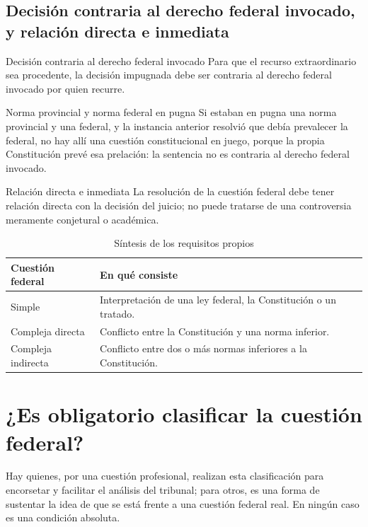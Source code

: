 \documentclass[12pt,oneside]{book}
\begin{document}
\subsection{Decisión contraria al derecho federal invocado, y relación directa e inmediata}

\begin{definition}{Decisión contraria al derecho federal invocado}
Para que el recurso extraordinario sea procedente, la decisión impugnada debe ser contraria al derecho federal invocado por quien recurre.
\end{definition}

\begin{example}{Norma provincial y norma federal en pugna}
Si estaban en pugna una norma provincial y una federal, y la instancia anterior resolvió que debía prevalecer la federal, no hay allí una cuestión constitucional en juego, porque la propia Constitución prevé esa prelación: la sentencia no es contraria al derecho federal invocado.
\end{example}

\begin{definition}{Relación directa e inmediata}
La resolución de la cuestión federal debe tener relación directa con la decisión del juicio; no puede tratarse de una controversia meramente conjetural o académica.
\end{definition}

\begin{table}[H]
\centering
\caption{Síntesis de los requisitos propios}
\begin{tabularx}{\textwidth}{Q{0.25\textwidth}Y}
\toprule
\textbf{Cuestión federal} & \textbf{En qué consiste} \\
\midrule
Simple & Interpretación de una ley federal, la Constitución o un tratado. \\
Compleja directa & Conflicto entre la Constitución y una norma inferior. \\
Compleja indirecta & Conflicto entre dos o más normas inferiores a la Constitución. \\
\bottomrule
\end{tabularx}
\end{table}

\section{¿Es obligatorio clasificar la cuestión federal?}

Hay quienes, por una cuestión profesional, realizan esta clasificación para encorsetar y facilitar el análisis del tribunal; para otros, es una forma de sustentar la idea de que se está frente a una cuestión federal real. En ningún caso es una condición absoluta.
\end{document}
